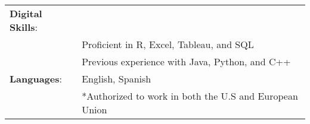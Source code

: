 \documentclass[paper=a4, fontsize=11pt]{scrartcl} %
\begin{document}
\begin{tabularx}{\linewidth}{ll}

 

\hspace{-3mm}

 

\textbf{Digital Skills}: &  \\

  & Proficient in R, Excel, Tableau, and SQL\\

 & Previous experience with Java, Python, and C++ \\[1mm]

 

\hspace{-3mm}

\textbf{Languages}: & English, Spanish \\

& *Authorized to work in both the U.S and European Union \\
[1mm]

 

\end{tabularx}

 
\end{document}
